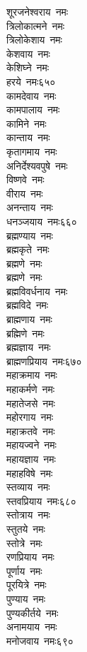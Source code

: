 \begin{multicols}{\maxColumns}
\begin{flushleft}
शूरजनेश्वराय~नमः\\
त्रिलोकात्मने~नमः\\
त्रिलोकेशाय~नमः\\
केशवाय~नमः\\
केशिघ्ने~नमः\\
हरये~नमः\hfill ६५०\\
कामदेवाय~नमः\\
कामपालाय~नमः\\
कामिने~नमः\\
कान्ताय~नमः\\
कृतागमाय~नमः\\
अनिर्देश्यवपुषे~नमः\\
विष्णवे~नमः\\
वीराय~नमः\\
अनन्ताय~नमः\\
धनञ्जयाय~नमः\hfill ६६०\\
ब्रह्मण्याय~नमः\\
ब्रह्मकृते~नमः\\
ब्रह्मणे~नमः\\
ब्रह्मणे~नमः\\
ब्रह्मविवर्धनाय~नमः\\
ब्रह्मविदे~नमः\\
ब्राह्मणाय~नमः\\
ब्रह्मिणे~नमः\\
ब्रह्मज्ञाय~नमः\\
ब्राह्मणप्रियाय~नमः\hfill ६७०\\
महाक्रमाय~नमः\\
महाकर्मणे~नमः\\
महातेजसे~नमः\\
महोरगाय~नमः\\
महाक्रतवे~नमः\\
महायज्वने~नमः\\
महायज्ञाय~नमः\\
महाहविषे~नमः\\
स्तव्याय~नमः\\
स्तवप्रियाय~नमः\hfill ६८०\\
स्तोत्राय~नमः\\
स्तुतये~नमः\\
स्तोत्रे~नमः\\
रणप्रियाय~नमः\\
पूर्णाय~नमः\\
पूरयित्रे~नमः\\
पुण्याय~नमः\\
पुण्यकीर्तये~नमः\\
अनामयाय~नमः\\
मनोजवाय~नमः\hfill ६९०\\

\end{flushleft}
\end{multicols}
